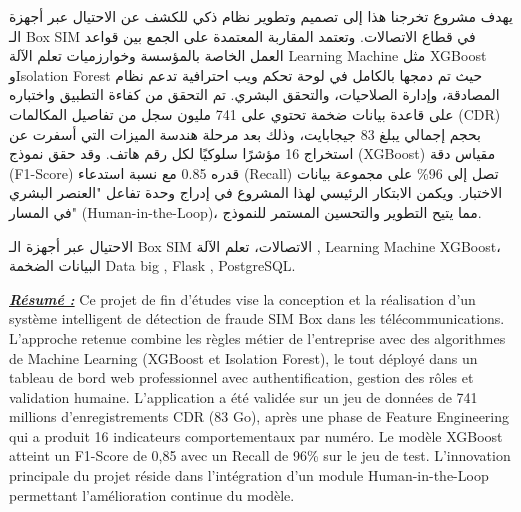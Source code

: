 \documentclass[12pt, oneside, a4paper]{report}
\begin{document}
\begin{otherlanguage}{arabic}
\vspace{-0.2cm}

{\fontsize{10.5pt}{14pt}\selectfont
يهدف مشروع تخرجنا هذا إلى تصميم وتطوير نظام ذكي للكشف عن الاحتيال عبر أجهزة الـ Box SIM في قطاع الاتصالات. وتعتمد المقاربة المعتمدة على الجمع بين قواعد العمل الخاصة بالمؤسسة وخوارزميات تعلم الآلة Learning Machine  مثل XGBoost وIsolation Forest حيث تم دمجها بالكامل في لوحة تحكم ويب احترافية تدعم نظام المصادقة، وإدارة الصلاحيات، والتحقق البشري. تم التحقق من كفاءة التطبيق واختباره على قاعدة بيانات ضخمة تحتوي على 741 مليون سجل من تفاصيل المكالمات (CDR) بحجم إجمالي يبلغ 83 جيجابايت، وذلك بعد مرحلة هندسة الميزات التي أسفرت عن استخراج 16 مؤشرًا سلوكيًا لكل رقم هاتف. وقد حقق نموذج (XGBoost) مقياس دقة (F1-Score) قدره 0.85 مع نسبة استدعاء (Recall) تصل إلى 96\% على مجموعة بيانات الاختبار. ويكمن الابتكار الرئيسي لهذا المشروع في إدراج وحدة تفاعل "العنصر البشري في المسار" (Human-in-the-Loop)، مما يتيح التطوير والتحسين المستمر للنموذج.
}

\vspace{0.4cm}

 الاحتيال عبر أجهزة الـ Box SIM  الاتصالات، تعلم الآلة , Learning Machine  XGBoost، البيانات الضخمة Data big ,  Flask ,  PostgreSQL.

\end{otherlanguage}

\noindent \underline{\textit{\textbf{\color{blue}Résumé :}}} Ce projet de fin d'études vise la conception et la réalisation d'un système intelligent de détection de fraude SIM Box dans les télécommunications. L'approche retenue combine les règles métier de l'entreprise avec des algorithmes de Machine Learning (XGBoost et Isolation Forest), le tout déployé dans un tableau de bord web professionnel avec authentification, gestion des rôles et validation humaine. L'application a été validée sur un jeu de données de 741 millions d'enregistrements CDR (83 Go), après une phase de Feature Engineering qui a produit 16 indicateurs comportementaux par numéro. Le modèle XGBoost atteint un F1-Score de 0,85 avec un Recall de 96\% sur le jeu de test. L'innovation principale du projet réside dans l'intégration d'un module Human-in-the-Loop permettant l'amélioration continue du modèle.
\end{document}
